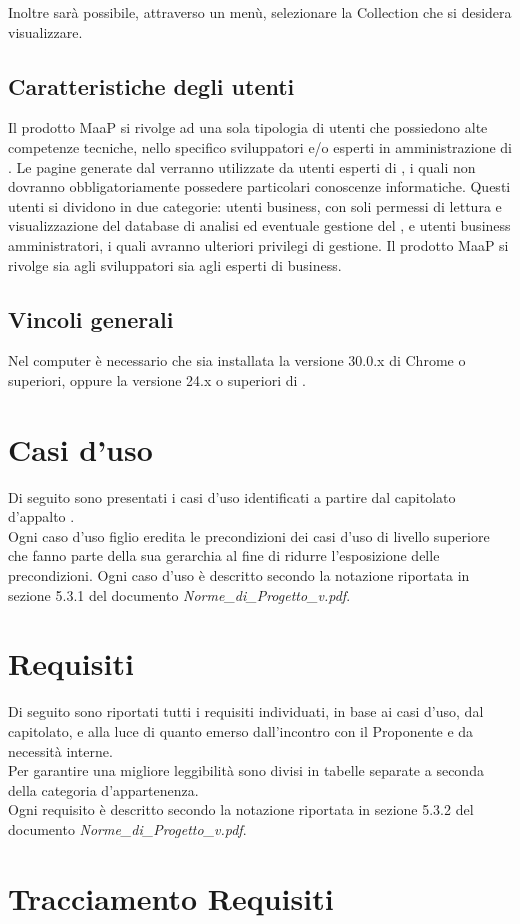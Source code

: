 Inoltre sarà possibile, attraverso un menù, selezionare la Collection che si desidera visualizzare.

\subsection{Caratteristiche degli utenti}
Il prodotto MaaP si rivolge ad una sola tipologia di utenti che possiedono alte competenze tecniche, nello specifico sviluppatori e/o esperti in amministrazione di . Le pagine generate dal  verranno utilizzate da utenti esperti di , i quali non dovranno obbligatoriamente possedere particolari conoscenze informatiche. Questi utenti si dividono in due categorie: utenti business, con soli permessi di lettura e visualizzazione del database di analisi ed eventuale gestione del , e utenti business amministratori, i quali avranno ulteriori privilegi di gestione.
Il prodotto MaaP si rivolge sia agli sviluppatori sia agli esperti di business.

\subsection{Vincoli generali}
Nel computer è necessario che sia installata la versione 30.0.x di  Chrome o superiori, oppure la versione 24.x o superiori di .

\newpage
\section{Casi d'uso} %
Di seguito sono presentati i casi d'uso identificati a partire dal capitolato d'appalto \Progetto. \\
Ogni caso d'uso figlio eredita le precondizioni dei casi d'uso di livello superiore che fanno parte della sua gerarchia al fine di ridurre l'esposizione delle precondizioni.
Ogni caso d'uso è descritto secondo la notazione riportata in sezione 5.3.1 del documento \emph{Norme\_{}di\_{}Progetto\_{}v\versioneNormeDiProgetto{}.pdf}.




\newpage


\newpage


\newpage
\section{Requisiti} %
Di seguito sono riportati tutti i requisiti individuati, in base ai casi d'uso, dal capitolato, e alla luce di quanto emerso dall'incontro con il Proponente e da necessità interne.\\
Per garantire una migliore leggibilità sono divisi in tabelle separate a seconda della categoria d'appartenenza.\\
Ogni requisito è descritto secondo la notazione riportata in sezione 5.3.2 del documento \emph{Norme\_{}di\_{}Progetto\_{}v\versioneNormeDiProgetto{}.pdf}.



\newpage
\section{Tracciamento Requisiti}



